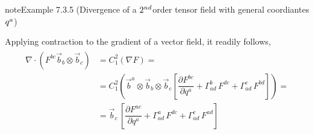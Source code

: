 \documentclass[letterpaper,10pt,english]{jupyterBook}
\begin{document}
\begin{sphinxadmonition}{note}{Example 7.3.5 (Divergence of a \protect\(2^{nd}\protect\)\sphinxhyphen{}order tensor field \sphinxhyphen{} with general coordiantes \protect\(q^{a}\protect\))}



\sphinxAtStartPar
Applying contraction to the gradient of a vector field, it readily follows,
\begin{equation*}
\begin{split}\begin{aligned}
  \nabla \cdot \left( F^{bc} \vec{b}_b \otimes \vec{b}_c \right)
  & = C_{1}^{2} \left( \nabla F \right) = \\
  & = C_1^2 \left( \vec{b}^a \otimes \vec{b}_b \otimes \vec{b}_c \left[ \dfrac{\partial F^{bc}}{\partial q^a} + \Gamma_{ad}^b \, F^{dc} + \Gamma^{c}_{ad} \, F^{bd}  \right]  \right) = \\
  & = \vec{b}_c \, \left[ \dfrac{\partial F^{ac}}{\partial q^a} + \Gamma_{ad}^a \, F^{dc} + \Gamma^{c}_{ad} \, F^{ad}  \right] 
\end{aligned}\end{split}
\end{equation*}\end{sphinxadmonition}
\end{document}
